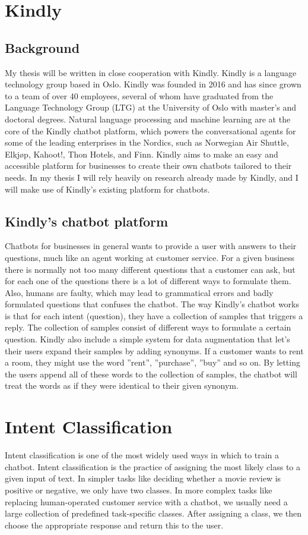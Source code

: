 \documentclass{report}
\begin{document}
\section{Kindly}
\subsection{Background}
My thesis will be written in close cooperation with Kindly. Kindly is a language technology group based in Oslo. Kindly was founded in 2016 and has since grown to a team of over 40 employees, several of whom have graduated from the Language Technology Group (LTG) at the University of Oslo with master’s and doctoral degrees. Natural language processing and machine learning are at the core of the Kindly chatbot platform, which powers the conversational agents for some of the leading enterprises in the Nordics, such as Norwegian Air Shuttle, Elkjøp, Kahoot!, Thon Hotels, and Finn. Kindly aims to make an easy and accessible platform for businesses to create their own chatbots tailored to their needs.
In my thesis I will rely heavily on research already made by Kindly, and I will make use of Kindly's existing platform for chatbots.
\subsection{Kindly's chatbot platform}
Chatbots for businesses in general wants to provide a user with answers to their questions, much like an agent working at customer service. For a given business there is normally not too many different questions that a customer can ask, but for each one of the questions there is a lot of different ways to formulate them. Also, humans are faulty, which may lead to grammatical errors and badly formulated questions that confuses the chatbot. The way Kindly's chatbot works is that for each intent (question), they have a collection of samples that triggers a reply. The collection of samples consist of different ways to formulate a certain question. Kindly also include a simple system for data augmentation that let's their users expand their samples by adding synonyms. If a customer wants to rent a room, they might use the word ''rent'', ''purchase'', ''buy'' and so on. By letting the users append all of these words to the collection of samples, the chatbot will treat the words as if they were identical to their given synonym.
\newpage
\section{Intent Classification}
Intent classification is one of the most widely used ways in which to train a chatbot. Intent classification is the practice of assigning the most likely class to a given input of text. In simpler tasks like deciding whether a movie review is positive or negative, we only have two classes. In more complex tasks like replacing human-operated customer service with a chatbot, we usually need a large collection of predefined task-specific classes. 
\noindent
After assigning a class, we then choose the appropriate response and return this to the user. \\\\ 
\end{document}
